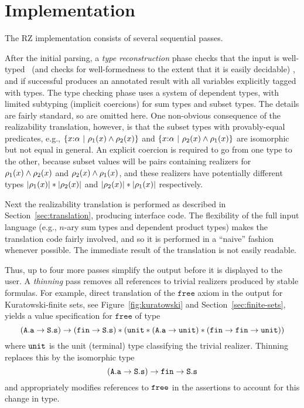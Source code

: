 \section{Implementation}
\label{sec:implementation}

The RZ implementation consists of several sequential passes.

After the initial parsing, a \emph{type reconstruction} phase checks
that the input is well-typed%
\iflong 
\ (and checks for well-formedness to the
extent that it is easily decidable)%
\fi
, and if successful produces an
annotated result with all variables explicitly tagged with types. The
type checking phase uses a system of dependent types, with limited
subtyping (implicit coercions) for sum types and subset types. 
\iflong
The
details are fairly standard, so are omitted here. One non-obvious
consequence of the realizability translation, however, is that the
subset types with provably-equal predicates, e.g.,
$\{x{:}\alpha\ |\ \rho_1(x)\land \rho_2(x)\}$ and
$\{x{:}\alpha\ |\ \rho_2(x)\land \rho_1(x)\}$ are isomorphic
but not equal in general. An
explicit coercion is required to go from one type to the other,
because subset values will be pairs containing realizers for
$\rho_1(x)\land \rho_2(x)$ and
$\rho_2(x)\land \rho_1(x)$, and these realizers have
potentially different types $|\rho_1(x)| * |\rho_2(x)|$ and
$|\rho_2(x)| * |\rho_1(x)|$ respectively.
\fi %

Next the realizability translation is performed as described in
Section~\ref{sec:translation}, producing interface code. The
flexibility of the full input language (e.g., $n$-ary sum types and
dependent product types) makes the translation code fairly involved,
and so it is performed in a ``naive'' fashion whenever possible. The
immediate result of the translation is not easily readable.
 
Thus, up to four more passes simplify the output before it is displayed to
the user. A \emph{thinning} pass removes all references to trivial
realizers produced by stable formulas.
\iflong
For example, direct translation
of the $\mathtt{free}$ axiom in the output for Kuratowski-finite sets,
see Figure~\ref{fig:kuratowski} and Section~\ref{sec:finite-sets},
yields a value specification for $\mathtt{free}$ of type
%
\begin{equation*}
  (\mathtt{A.a} \to \mathtt{S.s}) \to 
  (\mathtt{fin} \to \mathtt{S.s}) * (\mathtt{unit} * (\mathtt{A.a} \to
  \mathtt{unit}) *
  (\mathtt{fin} \to \mathtt{fin} \to \mathtt{unit}))
\end{equation*}
%
where $\mathtt{unit}$ is the unit (terminal) type classifying the trivial
realizer. Thinning replaces this by the isomorphic type
%
\begin{equation*}
  (\mathtt{A.a} \to \mathtt{S.s}) \to \mathtt{fin} \to \mathtt{S.s}
\end{equation*}
%
and appropriately modifies references to $\mathtt{free}$ in the assertions to account for this change in type.

